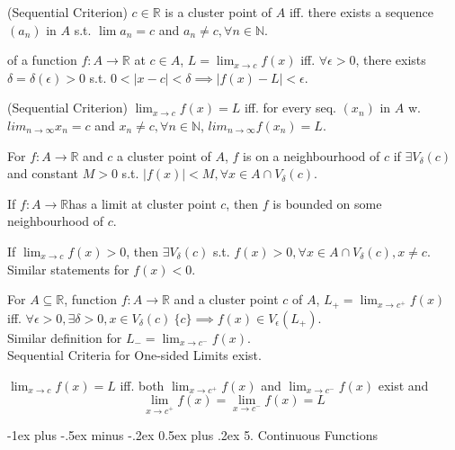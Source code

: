 \documentclass[10pt,landscape,letterpaper]{article}
\makeatletter
\renewcommand{\section}{\@startsection{section}{1}{0mm}%
                                {-1ex plus -.5ex minus -.2ex}%
                                {0.5ex plus .2ex}%
                                {\sffamily\large}}
\makeatother
\begin{document}
\begin{multicols}{3}
 (Sequential Criterion) $c \in \mathbb{R}$ is a cluster point of $A$ iff. there exists a sequence $(a_n)$ in $A$ s.t. $\lim a_n = c$ and $a_n \neq c, \forall n \in \mathbb{N}$.

 of a function $f: A \to \mathbb{R}$ at $c \in A$, $L = \lim_{x \to c} f(x)$ iff. $\forall \epsilon > 0$, there exists $\delta = \delta(\epsilon) > 0$ s.t. $0 < |x - c| < \delta \implies |f(x) - L| < \epsilon$.

 (Sequential Criterion) $\lim_{x \to c} f(x) = L$ iff. for every seq. $(x_n)$ in $A$ w. $lim_{n \to \infty} x_n = c$ and $x_n \neq c, \forall n \in \mathbb{N}$, $lim_{n \to \infty} f(x_n) = L$.


\smallbreak


For $f: A \to \mathbb{R}$ and $c$ a cluster point of $A$, $f$ is  on a neighbourhood of $c$ if $\exists V_\delta(c)$ and constant $M > 0$ s.t. $|f(x)| < M, \forall x \in A \cap V_\delta(c)$.


 If $f: A \to \mathbb{R}$has a limit at cluster point $c$, then $f$ is bounded on some neighbourhood of $c$.


\smallbreak


 If $\lim_{x\to c} f(x) > 0$, then $\exists V_\delta(c)$ s.t. $f(x) > 0, \forall x \in A \cap V_\delta(c), x \neq c$.
\\
Similar statements for $f(x) < 0$.


\smallbreak



For $A\subseteq \mathbb{R}$, function $f: A \to \mathbb{R}$ and a cluster point $c$ of $A$,  $L_{+}  = \lim_{x \to c^+} f(x)$ iff. $\forall \epsilon > 0, \exists \delta > 0, x \in V_{\delta}(c) \ \{ c \} \implies f(x) \in V_{\epsilon}(L_{+})$.
\\
Similar definition for  $L_{-}  = \lim_{x \to c^-} f(x)$.
\\
Sequential Criteria for One-sided Limits exist.


 $\lim_{x \to c} f(x) = L$ iff. both $\lim_{x \to c^+} f(x)$ and $\lim_{x \to c^-} f(x)$ exist and 
\[
\lim_{x \to c^+} f(x) = \lim_{x \to c^-} f(x) = L
\]




\section{5. Continuous Functions}

\end{multicols}
\end{document}
